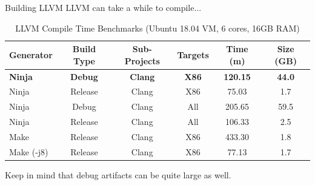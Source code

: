 \documentclass{beamer}
\begin{document}

\begin{frame}{Building LLVM}
    LLVM can take a while to compile...

    \begin{table}
        \footnotesize
        \centering
        \begin{tabular}{l c c c | c c}
            \toprule
            Generator & Build Type & Sub-Projects & Targets & Time (m) & Size (GB) \\
            \toprule
            \textbf{Ninja} & \textbf{Debug} & \textbf{Clang} & \textbf{X86} & \textbf{120.15} & \textbf{44.0} \\
            Ninja      & Release & Clang & X86 & 75.03  & 1.7  \\
            Ninja      & Debug   & Clang & All & 205.65 & 59.5 \\
            Ninja      & Release & Clang & All & 106.33 & 2.5  \\
            Make       & Release & Clang & X86 & 433.30 & 1.8  \\
            Make (-j8) & Release & Clang & X86 & 77.13  & 1.7  \\
            \bottomrule
        \end{tabular}
        \caption{\footnotesize LLVM Compile Time Benchmarks (Ubuntu 18.04 VM, 6 cores, 16GB RAM)}
    \end{table}

    Keep in mind that debug artifacts can be quite large as well.
\end{frame}
\end{document}
